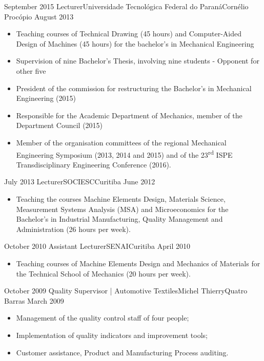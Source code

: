 \begin{experiences}
  \emptySeparator
  
  \experience
    {September 2015}   {Lecturer}{Universidade Tecnológica Federal do Paraná}{Cornélio Procópio}
    {August 2013} {
                      \begin{itemize}
                        \item Teaching courses of Technical Drawing (45 hours) and Computer-Aided Design of Machines (45 hours) for the bachelor's in Mechanical Engineering
                        \item Supervision of nine Bachelor's Thesis, involving nine students - Opponent for other five
                        \item President of the commission for restructuring the Bachelor's in Mechanical Engineering (2015)             
                        \item Responsible for the Academic Department of Mechanics, member of the Department Council (2015)             
                        \item Member of the organisation committees of the regional Mechanical Engineering Symposium (2013, 2014 and 2015) and of the 23\textsuperscript{rd} ISPE Transdisciplinary Engineering Conference (2016).
                      \end{itemize} 
                    }
                
  \emptySeparator
  \experience
    {July 2013} {Lecturer}{SOCIESC}{Curitiba}
    {June 2012}    {
                      \begin{itemize}
                        \item Teaching the courses Machine Elements Design, Materials Science, Measurement Systems Analysis (MSA) and Microeconomics for the Bachelor's in Industrial Manufacturing, Quality Management and Administration (26 hours per week).
                      \end{itemize}
                    }
                
  \emptySeparator
  \experience
    {October 2010} {Assistant Lecturer}{SENAI}{Curitiba}
    {April 2010}    {
                      \begin{itemize}
                        \item Teaching courses of Machine Elements Design and Mechanics of Materials for the Technical School of Mechanics (20 hours per week).
                      \end{itemize}
                    }
            
  \emptySeparator\experience
    {October 2009}     {Quality Supervisor | Automotive Textiles}{Michel Thierry}{Quatro Barras}
    {March 2009}    {
                      \begin{itemize}
                        \item Management of the quality control staff of four people;
                        \item Implementation of quality indicators and improvement tools;
                        \item Customer assistance, Product and Manufacturing Process auditing.
                      \end{itemize}
                    }
                

\end{experiences}
